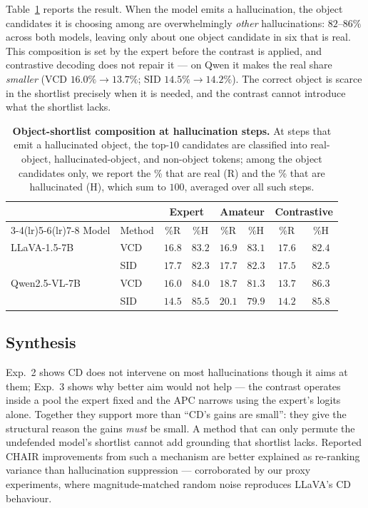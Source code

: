 \documentclass{article}
\begin{document}
Table~\ref{tab:cdmech-shortlist} reports the result. When the model emits a
hallucination, the object candidates it is choosing among are overwhelmingly
\emph{other} hallucinations: $82$--$86\%$ across both models, leaving only about
one object candidate in six that is real. This composition is set by the expert
before the contrast is applied, and contrastive decoding does not repair it ---
on Qwen it makes the real share \emph{smaller} (VCD $16.0\%\!\to\!13.7\%$; SID
$14.5\%\!\to\!14.2\%$). The correct object is scarce in the shortlist precisely
when it is needed, and the contrast cannot introduce what the shortlist lacks.

\begin{table}[t]
\centering
\small
\setlength{\tabcolsep}{5pt}
\caption{\textbf{Object-shortlist composition at hallucination steps.} At steps
that emit a hallucinated object, the top-$10$ candidates are classified into
real-object, hallucinated-object, and non-object tokens; among the object
candidates only, we report the \% that are real (R) and the \% that are
hallucinated (H), which sum to $100$, averaged over all such steps.}
\label{tab:cdmech-shortlist}
\begin{tabular}{ll cc cc cc}
\toprule
& & \multicolumn{2}{c}{Expert} & \multicolumn{2}{c}{Amateur} & \multicolumn{2}{c}{Contrastive} \\
\cmidrule(lr){3-4}\cmidrule(lr){5-6}\cmidrule(lr){7-8}
Model & Method & \%R & \%H & \%R & \%H & \%R & \%H \\
\midrule
LLaVA-1.5-7B & VCD & $16.8$ & $83.2$ & $16.9$ & $83.1$ & $17.6$ & $82.4$ \\
 & SID & $17.7$ & $82.3$ & $17.7$ & $82.3$ & $17.5$ & $82.5$ \\
Qwen2.5-VL-7B & VCD & $16.0$ & $84.0$ & $18.7$ & $81.3$ & $13.7$ & $86.3$ \\
 & SID & $14.5$ & $85.5$ & $20.1$ & $79.9$ & $14.2$ & $85.8$ \\
\bottomrule
\end{tabular}
\end{table}

\subsection{Synthesis}
\label{subsec:cdmech-res-synthesis}

Exp.~2 shows CD does not intervene on most hallucinations though it aims at
them; Exp.~3 shows why better aim would not help --- the contrast operates
inside a pool the expert fixed and the APC narrows using the expert's logits
alone. Together they support more than ``CD's gains are small'': they give the
structural reason the gains \emph{must} be small. A method that can only permute
the undefended model's shortlist cannot add grounding that shortlist lacks.
Reported CHAIR improvements from such a mechanism are better explained as
re-ranking variance than hallucination suppression --- corroborated by our proxy
experiments, where magnitude-matched random noise reproduces LLaVA's CD
behaviour.
\end{document}
